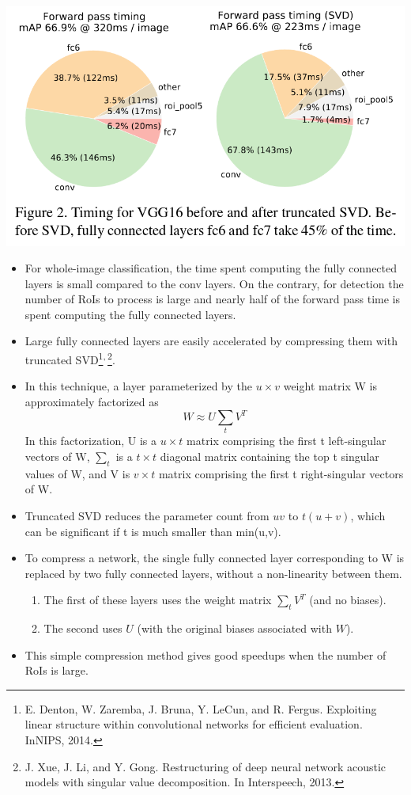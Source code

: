 \documentclass[11pt]{article}
\begin{document}
   \includegraphics[width=.9\linewidth]{./pic_fast_rcnn/2.png}
\begin{itemize}
\item For whole-image classification, the time spent computing the fully connected layers is small 
     compared to the conv layers. On the contrary, for detection the number of RoIs to process is
     large and nearly half of the forward pass time is spent computing the fully connected layers.
\item Large fully connected layers are easily accelerated by compressing them with truncated 
     SVD\footnote{E. Denton, W. Zaremba, J. Bruna, Y. LeCun, and R. Fergus.
Exploiting linear structure within convolutional networks for efficient evaluation. 
InNIPS, 2014.
 }\textsuperscript{,}\,\footnote{J.  Xue,  J.  Li,  and  Y.  Gong.   
Restructuring  of  deep  neural network acoustic models with singular value decomposition.
In Interspeech, 2013.
 }.
\item In this technique, a layer parameterized by the $u\times{v}$ weight matrix W is approximately 
     factorized as
     \begin{equation}
       W\approx{U\sum_tV^T}
     \end{equation}
     In this factorization, U is a $u\times{t}$ matrix comprising the first t left-singular vectors
     of W, $\sum_t$ is a $t\times{t}$ diagonal matrix containing the top t singular values of W,
     and V is $v\times{t}$ matrix comprising the first t right-singular vectors of W.
\item Truncated SVD reduces the parameter count from $uv$ to $t(u+v)$, which can be 
     significant if t is much smaller than min(u,v).
\item To compress a network, the single fully connected layer corresponding to W is replaced
     by two fully connected layers, without a non-linearity between them.
\begin{enumerate}
\item The first of these layers uses the weight matrix $\sum_tV^T$ (and no biases).
\item The second uses $U$ (with the original biases associated with $W$).
\end{enumerate}
\item This simple compression method gives good speedups when the number of RoIs is large.
\end{itemize}
     
\end{document}

